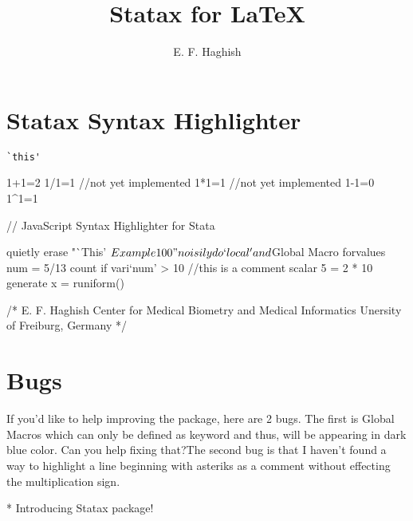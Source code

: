 \documentclass[12pt]{article}
\title{Statax for LaTeX}
\author{E. F. Haghish}
\begin{document}
	
	\maketitle
	
\section{Statax Syntax Highlighter}
	
	\verb|`this'|
	\begin{statax}
	
	1+1=2
	1/1=1 //not yet implemented
	1*1=1 //not yet implemented
	1-1=0
	1^1=1
	
	// JavaScript Syntax Highlighter for Stata
	
	quietly erase "`This' $Example 100"
	noisily do `local' and $Global Macro 
	forvalues num = 5/13 {
	count if vari`num' > 10 //this is a comment
	scalar 5 = 2 * 10 
	generate x = runiform()
	}
	
	/*
	E. F. Haghish
	Center for Medical Biometry and Medical Informatics
	Unersity of Freiburg, Germany
	*/
	\end{statax}

\section{Bugs}
If you'd like to help improving the package, here are 2 bugs. The first is Global Macros which can only be defined as keyword and thus, will be appearing in dark blue color. Can you help fixing that?The second bug is that I haven't found a way to highlight a line beginning with asteriks as a comment without effecting the multiplication sign. 
	
	\begin{statax}
	* Introducing Statax package!  
	\end{statax}
\end{document}
